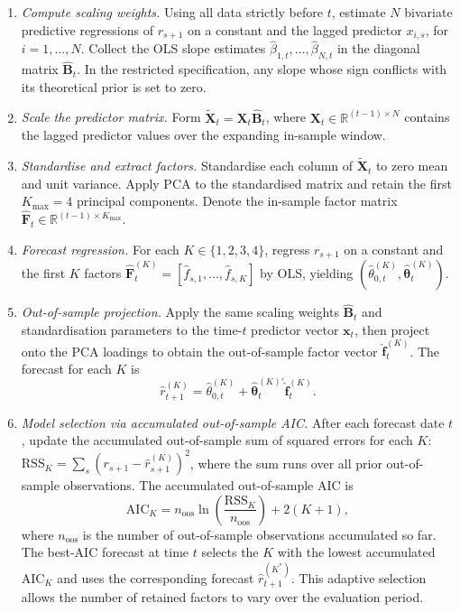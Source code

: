 \documentclass[a4paper,11pt]{article}
\begin{document}
\begin{enumerate}
    \item \textit{Compute scaling weights.} Using all data strictly before $t$, estimate $N$ bivariate predictive regressions of $r_{s+1}$ on a constant and the lagged predictor $x_{i,s}$, for $i = 1,\ldots,N$. Collect the OLS slope estimates $\hat{\beta}_{1,t},\ldots,\hat{\beta}_{N,t}$ in the diagonal matrix $\hat{\mathbf{B}}_t$. In the restricted specification, any slope whose sign conflicts with its theoretical prior is set to zero.

    \item \textit{Scale the predictor matrix.} Form $\tilde{\mathbf{X}}_t = \mathbf{X}_t \hat{\mathbf{B}}_t$, where $\mathbf{X}_t \in \mathbb{R}^{(t-1) \times N}$ contains the lagged predictor values over the expanding in-sample window.

    \item \textit{Standardise and extract factors.} Standardise each column of $\tilde{\mathbf{X}}_t$ to zero mean and unit variance. Apply PCA to the standardised matrix and retain the first $K_{\max} = 4$ principal components. Denote the in-sample factor matrix $\hat{\mathbf{F}}_t \in \mathbb{R}^{(t-1) \times K_{\max}}$.

    \item \textit{Forecast regression.} For each $K \in \{1,2,3,4\}$, regress $r_{s+1}$ on a constant and the first $K$ factors $\hat{\mathbf{F}}_t^{(K)} = [\hat{f}_{s,1},\ldots,\hat{f}_{s,K}]$ by OLS, yielding $(\hat{\theta}_{0,t}^{(K)}, \hat{\boldsymbol{\theta}}_t^{(K)})$.

    \item \textit{Out-of-sample projection.} Apply the same scaling weights $\hat{\mathbf{B}}_t$ and standardisation parameters to the time-$t$ predictor vector $\mathbf{x}_t$, then project onto the PCA loadings to obtain the out-of-sample factor vector $\hat{\mathbf{f}}_t^{(K)}$. The forecast for each $K$ is
    $$\hat{r}_{t+1}^{(K)} = \hat{\theta}_{0,t}^{(K)} + \hat{\boldsymbol{\theta}}_t^{(K)\prime} \hat{\mathbf{f}}_t^{(K)}.$$

    \item \textit{Model selection via accumulated out-of-sample AIC.} After each forecast date $t$, update the accumulated out-of-sample sum of squared errors for each $K$: $\mathrm{RSS}_K = \sum_{s} (r_{s+1} - \hat{r}_{s+1}^{(K)})^2$, where the sum runs over all prior out-of-sample observations. The accumulated out-of-sample AIC is
    $$\mathrm{AIC}_K = n_{\mathrm{oos}} \ln\!\left(\frac{\mathrm{RSS}_K}{n_{\mathrm{oos}}}\right) + 2(K+1),$$
    where $n_{\mathrm{oos}}$ is the number of out-of-sample observations accumulated so far. The best-AIC forecast at time $t$ selects the $K$ with the lowest accumulated $\mathrm{AIC}_K$ and uses the corresponding forecast $\hat{r}_{t+1}^{(K^*)}$. This adaptive selection allows the number of retained factors to vary over the evaluation period.
\end{enumerate}
\end{document}
